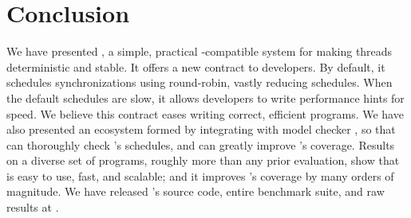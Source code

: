 \vspace{-.05in}
\section{Conclusion} \label{sec:conclusion}
\vspace{-.05in}

We have presented \xxx, a simple, practical \pthread-compatible system for
making threads deterministic and stable. It offers a new contract to
developers.  By default, it schedules synchronizations using round-robin,
vastly reducing schedules.  When the default schedules are slow, it
allows developers to write performance hints for speed.  We believe this
contract eases writing correct, efficient programs.  We have
also presented an ecosystem formed by integrating \xxx with model checker
\dbug, so that \dbug can thoroughly check \xxx's schedules, and \xxx can
greatly improve \dbug's coverage.  Results on a diverse set of \nprog
programs, roughly \overeach more than any prior evaluation,
show that \xxx is easy to use, fast, and scalable; and it improves \dbug's
coverage by many orders of magnitude.  We have released \xxx's source
code, entire benchmark suite, and raw results at \github.
